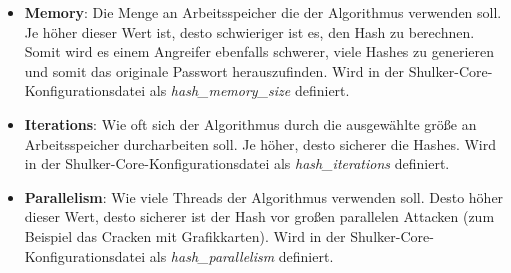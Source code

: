 \begin{itemize}
    \item \textbf{Memory}: Die Menge an Arbeitsspeicher die der Algorithmus verwenden soll. Je höher dieser Wert ist,
    desto schwieriger ist es, den Hash zu berechnen. Somit wird es einem Angreifer ebenfalls schwerer, viele Hashes zu generieren
    und somit das originale Passwort herauszufinden. Wird in der Shulker-Core-Konfigurationsdatei als \textit{hash\_memory\_size} definiert.
    \item \textbf{Iterations}: Wie oft sich der Algorithmus durch die ausgewählte größe an Arbeitsspeicher durcharbeiten soll. Je höher, desto
    sicherer die Hashes. Wird in der Shulker-Core-Konfigurationsdatei als \textit{hash\_iterations} definiert.
    \item \textbf{Parallelism}: Wie viele Threads der Algorithmus verwenden soll. Desto höher dieser Wert, desto sicherer ist der Hash
    vor großen parallelen Attacken (zum Beispiel das Cracken mit Grafikkarten). Wird in der Shulker-Core-Konfigurationsdatei als \textit{hash\_parallelism} definiert.
\end{itemize}